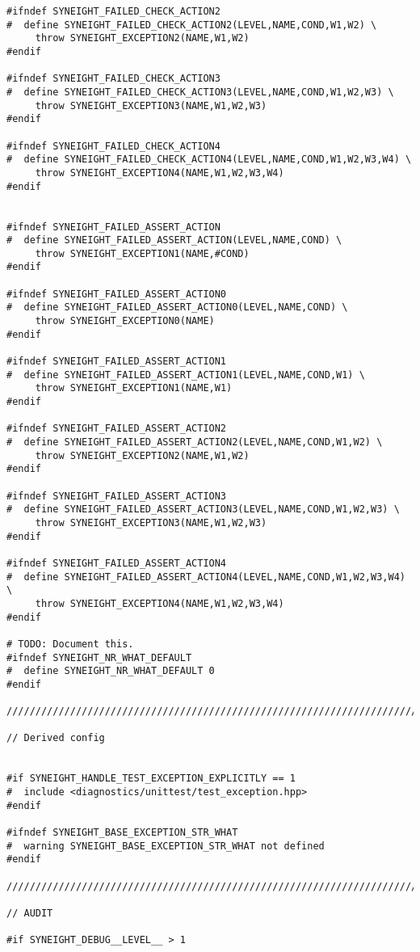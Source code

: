 \begin{verbatim}
#ifndef SYNEIGHT_FAILED_CHECK_ACTION2
#  define SYNEIGHT_FAILED_CHECK_ACTION2(LEVEL,NAME,COND,W1,W2) \
     throw SYNEIGHT_EXCEPTION2(NAME,W1,W2)
#endif

#ifndef SYNEIGHT_FAILED_CHECK_ACTION3
#  define SYNEIGHT_FAILED_CHECK_ACTION3(LEVEL,NAME,COND,W1,W2,W3) \
     throw SYNEIGHT_EXCEPTION3(NAME,W1,W2,W3)
#endif

#ifndef SYNEIGHT_FAILED_CHECK_ACTION4
#  define SYNEIGHT_FAILED_CHECK_ACTION4(LEVEL,NAME,COND,W1,W2,W3,W4) \
     throw SYNEIGHT_EXCEPTION4(NAME,W1,W2,W3,W4)
#endif


#ifndef SYNEIGHT_FAILED_ASSERT_ACTION
#  define SYNEIGHT_FAILED_ASSERT_ACTION(LEVEL,NAME,COND) \
     throw SYNEIGHT_EXCEPTION1(NAME,#COND)
#endif

#ifndef SYNEIGHT_FAILED_ASSERT_ACTION0
#  define SYNEIGHT_FAILED_ASSERT_ACTION0(LEVEL,NAME,COND) \
     throw SYNEIGHT_EXCEPTION0(NAME)
#endif

#ifndef SYNEIGHT_FAILED_ASSERT_ACTION1
#  define SYNEIGHT_FAILED_ASSERT_ACTION1(LEVEL,NAME,COND,W1) \
     throw SYNEIGHT_EXCEPTION1(NAME,W1)
#endif

#ifndef SYNEIGHT_FAILED_ASSERT_ACTION2
#  define SYNEIGHT_FAILED_ASSERT_ACTION2(LEVEL,NAME,COND,W1,W2) \
     throw SYNEIGHT_EXCEPTION2(NAME,W1,W2)
#endif

#ifndef SYNEIGHT_FAILED_ASSERT_ACTION3
#  define SYNEIGHT_FAILED_ASSERT_ACTION3(LEVEL,NAME,COND,W1,W2,W3) \
     throw SYNEIGHT_EXCEPTION3(NAME,W1,W2,W3)
#endif

#ifndef SYNEIGHT_FAILED_ASSERT_ACTION4
#  define SYNEIGHT_FAILED_ASSERT_ACTION4(LEVEL,NAME,COND,W1,W2,W3,W4) \
     throw SYNEIGHT_EXCEPTION4(NAME,W1,W2,W3,W4)
#endif

# TODO: Document this.
#ifndef SYNEIGHT_NR_WHAT_DEFAULT
#  define SYNEIGHT_NR_WHAT_DEFAULT 0
#endif 

////////////////////////////////////////////////////////////////////////////////

// Derived config


#if SYNEIGHT_HANDLE_TEST_EXCEPTION_EXPLICITLY == 1
#  include <diagnostics/unittest/test_exception.hpp>
#endif

#ifndef SYNEIGHT_BASE_EXCEPTION_STR_WHAT
#  warning SYNEIGHT_BASE_EXCEPTION_STR_WHAT not defined
#endif

////////////////////////////////////////////////////////////////////////////////

// AUDIT

#if SYNEIGHT_DEBUG__LEVEL__ > 1


\end{verbatim}

